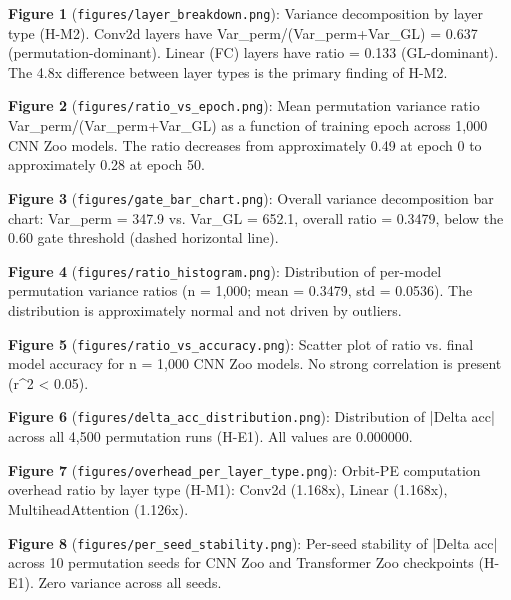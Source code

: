 
\textbf{Figure 1} (\texttt{figures/layer_breakdown.png}): Variance decomposition by layer type (H-M2). Conv2d layers have Var_perm/(Var_perm+Var_GL) = 0.637 (permutation-dominant). Linear (FC) layers have ratio = 0.133 (GL-dominant). The 4.8x difference between layer types is the primary finding of H-M2.

\textbf{Figure 2} (\texttt{figures/ratio_vs_epoch.png}): Mean permutation variance ratio Var_perm/(Var_perm+Var_GL) as a function of training epoch across 1,000 CNN Zoo models. The ratio decreases from approximately 0.49 at epoch 0 to approximately 0.28 at epoch 50.

\textbf{Figure 3} (\texttt{figures/gate_bar_chart.png}): Overall variance decomposition bar chart: Var_perm = 347.9 vs. Var_GL = 652.1, overall ratio = 0.3479, below the 0.60 gate threshold (dashed horizontal line).

\textbf{Figure 4} (\texttt{figures/ratio_histogram.png}): Distribution of per-model permutation variance ratios (n = 1,000; mean = 0.3479, std = 0.0536). The distribution is approximately normal and not driven by outliers.

\textbf{Figure 5} (\texttt{figures/ratio_vs_accuracy.png}): Scatter plot of ratio vs. final model accuracy for n = 1,000 CNN Zoo models. No strong correlation is present (r^2 < 0.05).

\textbf{Figure 6} (\texttt{figures/delta_acc_distribution.png}): Distribution of |Delta acc| across all 4,500 permutation runs (H-E1). All values are 0.000000.

\textbf{Figure 7} (\texttt{figures/overhead_per_layer_type.png}): Orbit-PE computation overhead ratio by layer type (H-M1): Conv2d (1.168x), Linear (1.168x), MultiheadAttention (1.126x).

\textbf{Figure 8} (\texttt{figures/per_seed_stability.png}): Per-seed stability of |Delta acc| across 10 permutation seeds for CNN Zoo and Transformer Zoo checkpoints (H-E1). Zero variance across all seeds.
